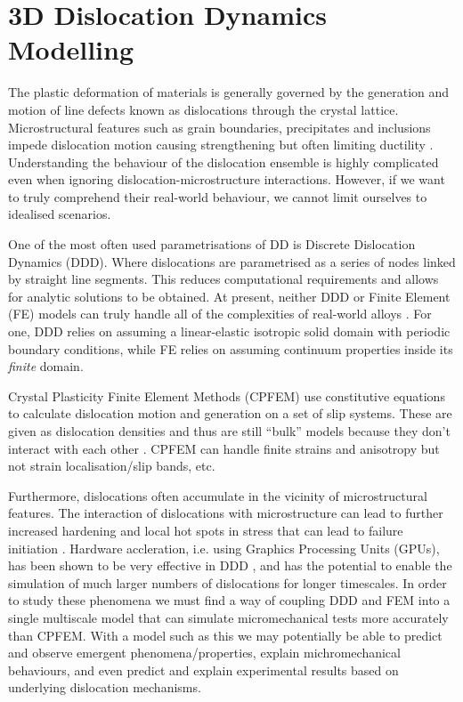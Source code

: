 \section{3D Dislocation Dynamics Modelling}
\label{s:3d_ddd}
The plastic deformation of materials is generally governed by the generation and motion of line defects known as dislocations through the crystal lattice. Microstructural features such as grain boundaries, precipitates and inclusions impede dislocation motion causing strengthening but often limiting ductility \cite{init_fail_dln}. Understanding the behaviour of the dislocation ensemble is highly complicated even when ignoring dislocation-microstructure interactions. However, if we want to truly comprehend their real-world behaviour, we cannot limit ourselves to idealised scenarios.

One of the most often used parametrisations of DD is Discrete Dislocation Dynamics (DDD). Where dislocations are parametrised as a series of nodes linked by straight line segments. This reduces computational requirements and allows for analytic solutions to be obtained. At present, neither DDD or Finite Element (FE) models can truly handle all of the complexities of real-world alloys \cite{ddd_fem1, paradis, fem_ddd2, fem_ddd}. For one, DDD relies on assuming a linear-elastic isotropic solid domain with periodic boundary conditions, while FE relies on assuming continuum properties inside its \emph{finite} domain.

Crystal Plasticity Finite Element Methods (CPFEM) use constitutive equations to calculate dislocation motion and generation on a set of slip systems. These are given as dislocation densities and thus are still ``bulk'' models because they don't interact with each other \cite{cpfem1}. CPFEM can handle finite strains and anisotropy but not strain localisation/slip bands, etc.

Furthermore, dislocations often accumulate in the vicinity of microstructural features. The interaction of dislocations with microstructure can lead to further increased hardening and local hot spots in stress that can lead to failure initiation \cite{size_effects, dln_ind_hard}. Hardware accleration, i.e. using Graphics Processing Units (GPUs), has been shown to be very effective in DDD \cite{gpu_ddd}, and has the potential to enable the simulation of much larger numbers of dislocations for longer timescales. In order to study these phenomena we must find a way of coupling DDD and FEM into a single multiscale model that can simulate micromechanical tests more accurately than CPFEM. With a model such as this we may potentially be able to predict and observe emergent phenomena/properties, explain michromechanical behaviours, and even predict and explain experimental results based on underlying dislocation mechanisms.

